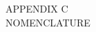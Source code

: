 \newpage
{}

\begin{center}
  APPENDIX C\\
  NOMENCLATURE       
\end{center}
\bigskip

\begin{multicols}{2}
\begin{acronym}[$c$] %
\end{acronym}
\end{multicols}
